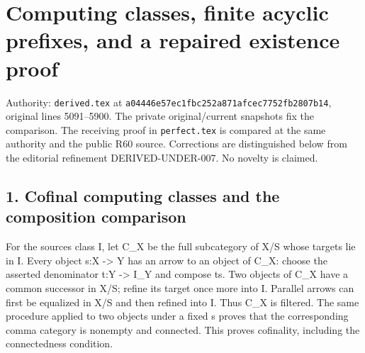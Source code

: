 \section{\texorpdfstring{Computing classes,\allowbreak{} finite acyclic prefixes,\allowbreak{} and a repaired existence proof}{Computing  finite acyclic  and a repaired existence proof}}\label{proofs-5091-5900-computing-classes-finite-acyclic-prefixes-and-a-repaired-existence-proof}

Authority:\allowbreak{} \texttt{derived.\allowbreak{}tex} at \texttt{a04446e5\allowbreak{}7ec1fbc2\allowbreak{}52a871af\allowbreak{}cec7752f\allowbreak{}b2807b14},\allowbreak{} original lines 5091–\allowbreak{}5900. The private original/\allowbreak{}current snapshots fix the comparison. The receiving proof in \texttt{perfect.\allowbreak{}tex} is compared at the same authority and the public R60 source. Corrections are distinguished below from the editorial refinement DERIVED-UNDER-007. No novelty is claimed.

\subsection{1. Cofinal computing classes and the composition comparison}\label{proofs-5091-5900-cofinal-computing-classes-and-the-composition-comparison}

For the source\textquotesingle s class I,\allowbreak{} let C\_\allowbreak{}X be the full subcategory of X/\allowbreak{}S whose targets lie in I. Every object s:\allowbreak{}X \allowbreak{}-> Y has an arrow to an object of C\_\allowbreak{}X:\allowbreak{} choose the asserted denominator t:\allowbreak{}Y \allowbreak{}-> I\_\allowbreak{}Y and compose ts. Two objects of C\_\allowbreak{}X have a common successor in X/\allowbreak{}S; refine its target once more into I. Parallel arrows can first be equalized in X/\allowbreak{}S and then refined into I. Thus C\_\allowbreak{}X is filtered. The same procedure applied to two objects under a fixed s proves that the corresponding comma category is nonempty and connected. This proves cofinality,\allowbreak{} including the connectedness condition.

